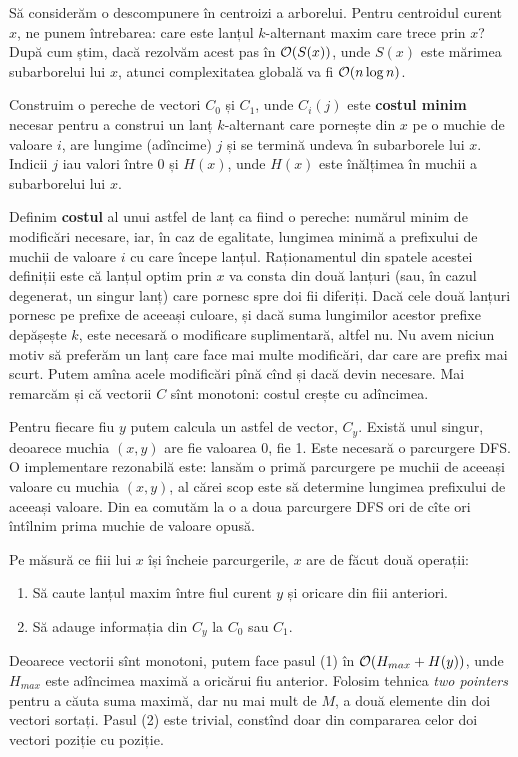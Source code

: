 \documentclass[../main.tex]{subfiles}
\begin{document}
Să considerăm o descompunere în centroizi a arborelui. Pentru centroidul curent $x$, ne punem întrebarea: care este lanțul $k$-alternant maxim care trece prin $x$? După cum știm, dacă rezolvăm acest pas în $\mathcal{O}(S(x))$, unde $S(x)$ este mărimea subarborelui lui $x$, atunci complexitatea globală va fi $\mathcal{O}(n \log n)$.

Construim o pereche de vectori $C_0$ și $C_1$, unde $C_i(j)$ este \textbf{costul minim} necesar pentru a construi un lanț $k$-alternant care pornește din $x$ pe o muchie de valoare $i$, are lungime (adîncime) $j$ și se termină undeva în subarborele lui $x$. Indicii $j$ iau valori între 0 și $H(x)$, unde $H(x)$ este înălțimea în muchii a subarborelui lui $x$.

Definim \textbf{costul} al unui astfel de lanț ca fiind o pereche: numărul minim de modificări necesare, iar, în caz de egalitate, lungimea minimă a prefixului de muchii de valoare $i$ cu care începe lanțul. Raționamentul din spatele acestei definiții este că lanțul optim prin $x$ va consta din două lanțuri (sau, în cazul degenerat, un singur lanț) care pornesc spre doi fii diferiți. Dacă cele două lanțuri pornesc pe prefixe de aceeași culoare, și dacă suma lungimilor acestor prefixe depășește $k$, este necesară o modificare suplimentară, altfel nu. Nu avem niciun motiv să preferăm un lanț care face mai multe modificări, dar care are prefix mai scurt. Putem amîna acele modificări pînă cînd și dacă devin necesare. Mai remarcăm și că vectorii $C$ sînt monotoni: costul crește cu adîncimea.

Pentru fiecare fiu $y$ putem calcula un astfel de vector, $C_y$. Există unul singur, deoarece muchia $(x,y)$ are fie valoarea 0, fie 1. Este necesară o parcurgere DFS. O implementare rezonabilă este: lansăm o primă parcurgere pe muchii de aceeași valoare cu muchia $(x,y)$, al cărei scop este să determine lungimea prefixului de aceeași valoare. Din ea comutăm la o a doua parcurgere DFS ori de cîte ori întîlnim prima muchie de valoare opusă.

Pe măsură ce fiii lui $x$ își încheie parcurgerile, $x$ are de făcut două operații:

\begin{enumerate}
  \item Să caute lanțul maxim între fiul curent $y$ și oricare din fiii anteriori.
  \item Să adauge informația din $C_y$ la $C_0$ sau $C_1$.
\end{enumerate}

Deoarece vectorii sînt monotoni, putem face pasul (1) în $\mathcal{O}(H_{max}+ H(y))$, unde $H_{max}$ este adîncimea maximă a oricărui fiu anterior. Folosim tehnica \textit{two pointers} pentru a căuta suma maximă, dar nu mai mult de $M$, a două elemente din doi vectori sortați. Pasul (2) este trivial, constînd doar din compararea celor doi vectori poziție cu poziție.
\end{document}
